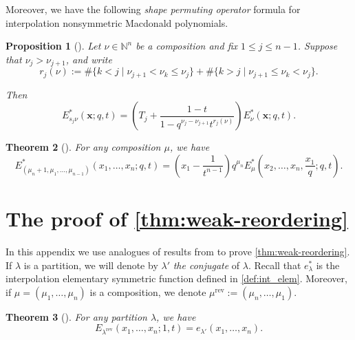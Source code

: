 \documentclass[12pt]{amsart}
\newtheorem{thm}{Theorem}[section]
\newtheorem{prop}[thm]{Proposition}
\theoremstyle{definition}
\newcommand{\bfx}{\boldsymbol{x}}
\DeclareMathOperator{\rev}{rev}
\newcommand{\NN}{\mathbb N}
\begin{document}
\begin{appendices}
Moreover, we have the following \emph{shape permuting
operator} formula for interpolation nonsymmetric Macdonald polynomials.

\begin{prop}[{\cite[Proposition 3.6]{BenDaliWilliams2025}}]
\label{prop:shape}
Let $\nu\in \NN^n$ be a composition and fix $1\leq j \leq n-1$. Suppose that $\nu_j>\nu_{j+1}$, and
write
\begin{equation}\label{eq:def_r}
r_j(\nu):=
\#\{k<j \mid \nu_{j+1}<\nu_{k}\leq \nu_j\}
+
\#\{k>j \mid \nu_{j+1}\leq \nu_k < \nu_j\}.
\end{equation}

Then
    \begin{equation}
\label{shape-permute}
E^*_{s_j \nu}(\bfx;q,t) = 
\left(T_j + \frac{1-t}{1-q^{\nu_{j}-\nu_{j+1}}t^{r_j(\nu)}}\right)
E^*_{\nu}(\bfx;q,t).
\end{equation}
\end{prop}


\begin{thm}[{\cite{Knop1997b,Sahi1996}}]\label{thm:KS_recurrence}
    For any composition $\mu$, we have
 \begin{equation}\label{eq:KS_recurrence}
  E^*_{(\mu_n+1,\mu_1,\dots,\mu_{n-1})}(x_1,\dots,x_n;q,t)=\left(x_1-\frac{1}{t^{n-1}}\right)q^{\mu_n}
  E_\mu^*\left(x_2,\dots,x_n,\frac{x_1}{q};q,t\right).  
    \end{equation}
\end{thm}



\section{The proof of \texorpdfstring{\cref{thm:weak-reordering}}{}}\label{app:permuted_basement}
In this appendix we use analogues of results from \cite{AlexanderssonSawhney2019,AyyerMartinWilliams2025} to 
prove \cref{thm:weak-reordering}. If $\lambda$ is a partition, we will denote by $\lambda'$ \textit{the conjugate} of $\lambda$.
Recall that $e_{\lambda}^*$ is the interpolation elementary symmetric function defined in \cref{def:int_elem}. Moreover, if $\mu=(\mu_1,\dots,\mu_n)$ is a composition, we denote $\mu^{\rev}:=(\mu_n,\dots,\mu_1)$.


\begin{thm}[{\cite[Theorem 18]{AlexanderssonSawhney2019}}]
\label{thm:E_partition_hom}
    For any partition $\lambda$, we have
    $$E^{}_{\lambda^{\rev}}(x_1,\dots,x_n;1,t)=e_{\lambda'}(x_1,\dots,x_n).$$
\end{thm}


\end{appendices}
\end{document}
